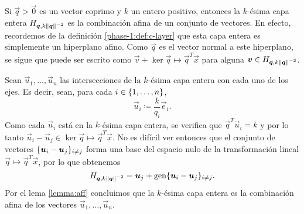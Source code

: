\begin{example}
	\label{ex:aff}


	Si $\vec{q} > \vec{0}$ es un vector coprimo y $k$ un entero positivo, entonces la $k$-ésima capa
	entera $H_{\boldsymbol{q}, k\left\lVert \boldsymbol{q} \right\rVert^{-2}}$ es la combinación afina de un conjunto de vectores.
	En efecto, recordemos de la definición \ref{phase-1:def:c-layer} que esta capa entera es
	simplemente un hiperplano afino. Como $\vec{q}$ es el vector normal a este hiperplano, se sigue
	que puede ser escrito como $\vec{v} + \ker{\vec{q} \mapsto \vec{q}^T\vec{x}}$ para alguna
	$\boldsymbol{v} \in H_{\boldsymbol{q}, k\left\lVert \boldsymbol{q} \right\rVert^{-2}}$.

	Sean $\vec{u}_1, \ldots, \vec{u}_n$ las intersecciones de la $k$-ésima capa entera con cada uno
	de los ejes. Es decir, sean, para cada $i \in \lbrace 1, \ldots, n \rbrace$,
	\begin{equation}
		\label{def:u-basis}
		\vec{u}_i \coloneq \frac{k}{q_i}\vec{e}_i.
	\end{equation}
	Como cada $\vec{u}_i$ está en la $k$-ésima capa entera, se verifica que $\vec{q}^T\vec{u}_i = k$
	y por lo tanto $\vec{u}_i - \vec{u}_j \in \ker{\vec{q} \mapsto \vec{q}^T\vec{x}}$. No es difícil
	ver entonces que el conjunto de vectores $\lbrace \boldsymbol{u}_i - \boldsymbol{u}_j \rbrace_{i \neq j}$ forma una
	base del espacio nulo de la transformación lineal $\vec{q} \mapsto \vec{q}^T\vec{x}$, por lo que
	obtenemos
	\begin{equation*}
		H_{\boldsymbol{q}, k\left\lVert \boldsymbol{q} \right\rVert^{-2}} = \boldsymbol{u}_j + \operatorname{gen}\lbrace \boldsymbol{u}_i - \boldsymbol{u}_j \rbrace_{i \neq
		j}.
	\end{equation*}
	Por el lema \ref{lemma:aff} concluimos que la $k$-ésima capa entera es la combinación
	afina de los vectores $\vec{u}_1, \ldots, \vec{u}_n$.
\end{example}

